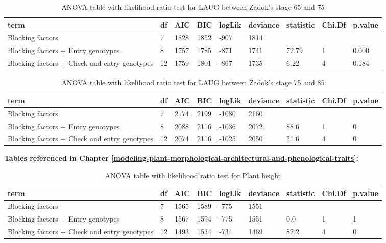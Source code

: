 \documentclass[12pt,oneside]{dukestatscithesis} %
\begin{document}
\begin{table}[H]

\caption{\label{tab:unnamed-chunk-4}\label{tab:lrt-laug1}ANOVA table with likelihood ratio test for LAUG between Zadok's stage 65 and 75}
\centering
\begin{tabular}[t]{>{\raggedright\arraybackslash}p{3.5cm}llllllll}
\toprule
term & df & AIC & BIC & logLik & deviance & statistic & Chi.Df & p.value\\
\midrule
Blocking factors & 7 & 1828 & 1852 & -907 & 1814 &  &  & \\
Blocking factors + Entry genotypes & 8 & 1757 & 1785 & -871 & 1741 & 72.79 & 1 & 0.000\\
Blocking factors + Check and entry genotypes & 12 & 1759 & 1801 & -867 & 1735 & 6.22 & 4 & 0.184\\
\bottomrule
\end{tabular}
\end{table}
\begin{table}[H]

\caption{\label{tab:unnamed-chunk-4}\label{tab:lrt-laug2}ANOVA table with likelihood ratio test for LAUG between Zadok's stage 75 and 85}
\centering
\begin{tabular}[t]{>{\raggedright\arraybackslash}p{3.5cm}llllllll}
\toprule
term & df & AIC & BIC & logLik & deviance & statistic & Chi.Df & p.value\\
\midrule
Blocking factors & 7 & 2174 & 2199 & -1080 & 2160 &  &  & \\
Blocking factors + Entry genotypes & 8 & 2088 & 2116 & -1036 & 2072 & 88.6 & 1 & 0\\
Blocking factors + Check and entry genotypes & 12 & 2074 & 2116 & -1025 & 2050 & 21.6 & 4 & 0\\
\bottomrule
\end{tabular}
\end{table}
\textbf{Tables referenced in Chapter \ref{modeling-plant-morphological-architectural-and-phenological-traits}:}
\begin{table}[H]

\caption{\label{tab:unnamed-chunk-5}\label{tab:lrt-plht}ANOVA table with likelihood ratio test for Plant height}
\centering
\begin{tabular}[t]{>{\raggedright\arraybackslash}p{3.5cm}llllllll}
\toprule
term & df & AIC & BIC & logLik & deviance & statistic & Chi.Df & p.value\\
\midrule
Blocking factors & 7 & 1565 & 1589 & -775 & 1551 &  &  & \\
Blocking factors + Entry genotypes & 8 & 1567 & 1594 & -775 & 1551 & 0.0 & 1 & 1\\
Blocking factors + Check and entry genotypes & 12 & 1493 & 1534 & -734 & 1469 & 82.2 & 4 & 0\\
\bottomrule
\end{tabular}
\end{table}
\end{document}
